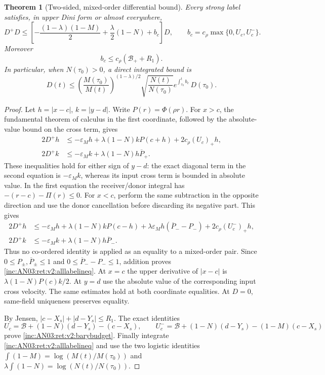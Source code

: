 \documentclass[11pt]{article}
\numberwithin{equation}{section}
\newtheorem{theorem}{Theorem}[section]
\theoremstyle{remark}\newtheorem{remark}[theorem]{Remark}
\newcommand{\1}{\mathbf 1}
\begin{document}
\begin{theorem}[Two-sided, mixed-order differential bound]
\label{inc:AN03:ret:v2:alllabel}
Every strong label satisfies, in upper Dini form or almost everywhere,
\begin{equation}\label{inc:AN03:ret:v2:alllabelineq}
 D^+D\le
 \left[-\frac{(1-\lambda)(1-M)}2+
       \frac\lambda2(1-N)+b_c\right]D,
 \qquad
 b_c=c_\rho\max\{0,U_c,U_c^-\}.
\end{equation}
Moreover
\begin{equation}\label{inc:AN03:ret:v2:barybudget}
 b_c\le c_\rho(\mathcal B_++R_1).
\end{equation}
In particular, when $N(\tau_0)>0$, a direct integrated bound is
\begin{equation}\label{inc:AN03:ret:v2:Gdirect}
 D(t)\le
 \left(\frac{M(\tau_0)}{M(t)}\right)^{(1-\lambda)/2}
 \sqrt{\frac{N(t)}{N(\tau_0)}}
 e^{\int_{\tau_0}^t b_c}\,D(\tau_0).
\end{equation}
\end{theorem}
\begin{proof}
Let $h=|x-c|$, $k=|y-d|$. Write $P(r)=\Phi(\rho r)$.
For $x>c$, the fundamental theorem of calculus in the first coordinate,
followed by the absolute-value bound on the cross term, gives
\begin{align*}
 2D^+h&\le-\varepsilon_Mh+\lambda(1-N)kP(c+h)
             +2c_\rho(U_c)_+h,\\
 2D^+k&\le-\varepsilon_Mk+\lambda(1-N)h\overline P_+.
\end{align*}
These inequalities hold for either sign of $y-d$: the exact diagonal
term in the second equation is $-\varepsilon_M k$, whereas its input
cross term is bounded in absolute value. In the first equation the
receiver/donor integral has $-(r-c)-\Pi(r)\le0$.
For $x<c$, perform the same subtraction in the opposite direction and
use the donor cancellation before discarding its negative part. This gives
\begin{align*}
 2D^+h&\le-\varepsilon_Mh+\lambda(1-N)kP(c-h)
  +\lambda\varepsilon_M h(\overline P_--P_-)
  +2c_\rho(U_c^-)_+h,\\
 2D^+k&\le-\varepsilon_Mk+\lambda(1-N)h\overline P_-.
\end{align*}
Thus no co-ordered identity is applied as an equality to a mixed-order
pair. Since $0\le P_\pm,\overline P_\pm\le1$ and
$0\le\overline P_--P_-\le1$, addition proves
\eqref{inc:AN03:ret:v2:alllabelineq}. At $x=c$ the upper derivative of
$|x-c|$ is $\lambda(1-N)P(c)k/2$. At $y=d$ use the absolute value of
the corresponding input cross velocity. The same estimates hold at both
coordinate equalities. At $D=0$, same-field uniqueness preserves equality.

By Jensen,
$|c-X_s|+|d-Y_s|\le R_1$.
The exact identities
\[
 U_c=\mathcal B+(1-N)(d-Y_s)-(c-X_s),\qquad
 U_c^-=\mathcal B+(1-N)(d-Y_s)-(1-M)(c-X_s)
\]
prove \eqref{inc:AN03:ret:v2:barybudget}.
Finally integrate \eqref{inc:AN03:ret:v2:alllabelineq} and use the two
logistic identities $\int(1-M)=\log(M(t)/M(\tau_0))$ and
$\lambda\int(1-N)=\log(N(t)/N(\tau_0))$.
\end{proof}
\end{document}
